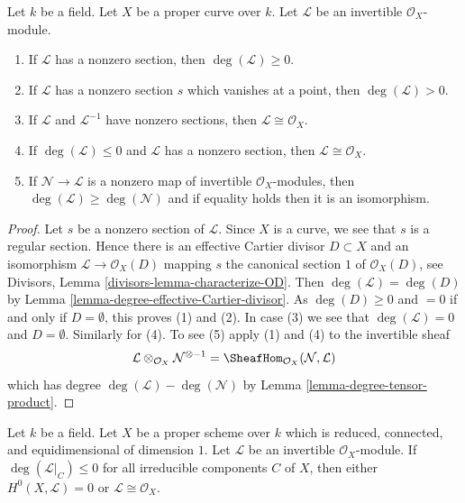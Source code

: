 \begin{lemma}
\label{lemma-check-invertible-sheaf-trivial}
Let $k$ be a field. Let $X$ be a proper curve over $k$.
Let $\mathcal{L}$ be an invertible $\mathcal{O}_X$-module.
\begin{enumerate}
\item If $\mathcal{L}$ has a nonzero section, then
$\deg(\mathcal{L}) \geq 0$.
\item If $\mathcal{L}$ has a nonzero section $s$ which vanishes
at a point, then $\deg(\mathcal{L}) > 0$.
\item If $\mathcal{L}$ and $\mathcal{L}^{-1}$ have nonzero sections, then
$\mathcal{L} \cong \mathcal{O}_X$.
\item If $\deg(\mathcal{L}) \leq 0$ and $\mathcal{L}$ has a nonzero
section, then $\mathcal{L} \cong \mathcal{O}_X$.
\item If $\mathcal{N} \to \mathcal{L}$ is a nonzero map of invertible
$\mathcal{O}_X$-modules, then $\deg(\mathcal{L}) \geq \deg(\mathcal{N})$
and if equality holds then it is an isomorphism.
\end{enumerate}
\end{lemma}

\begin{proof}
Let $s$ be a nonzero section of $\mathcal{L}$. Since $X$ is a curve, we
see that $s$ is a regular section. Hence there is an effective
Cartier divisor $D \subset X$ and an isomorphism
$\mathcal{L} \to \mathcal{O}_X(D)$ mapping $s$ the canonical
section $1$ of $\mathcal{O}_X(D)$, see
Divisors, Lemma \ref{divisors-lemma-characterize-OD}.
Then $\deg(\mathcal{L}) = \deg(D)$ by
Lemma \ref{lemma-degree-effective-Cartier-divisor}.
As $\deg(D) \geq 0$ and $= 0$
if and only if $D = \emptyset$, this proves (1) and (2).
In case (3) we see that $\deg(\mathcal{L}) = 0$ and
$D = \emptyset$. Similarly for (4). To see (5) apply
(1) and (4) to the invertible sheaf
$$
\mathcal{L} \otimes_{\mathcal{O}_X} \mathcal{N}^{\otimes -1} =
\SheafHom_{\mathcal{O}_X}(\mathcal{N}, \mathcal{L})
$$
which has degree $\deg(\mathcal{L}) - \deg(\mathcal{N})$
by Lemma \ref{lemma-degree-tensor-product}.
\end{proof}

\begin{lemma}
\label{lemma-no-sections-dual-nef}
Let $k$ be a field. Let $X$ be a proper scheme over $k$
which is reduced, connected, and equidimensional of dimension $1$.
Let $\mathcal{L}$ be an invertible $\mathcal{O}_X$-module.
If $\deg(\mathcal{L}|_C) \leq 0$ for all irreducible components $C$
of $X$, then either $H^0(X, \mathcal{L}) = 0$ or
$\mathcal{L} \cong \mathcal{O}_X$.
\end{lemma}

